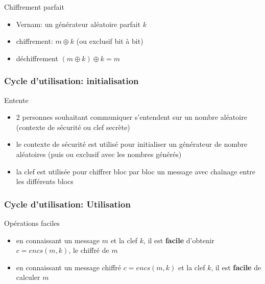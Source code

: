 \begin{reveals}
\begin{frame}
  \vfill

  \begin{block}{Chiffrement parfait}
    \begin{itemize}
    \item Vernam: un générateur aléatoire parfait \(k\)
    \item chiffrement: \(m \oplus k\) (ou exclusif bit à bit)
    \item déchiffrement \((m \oplus k)\oplus k = m\) 
    \end{itemize}
  \end{block}

  \vfill


\end{frame}


\begin{frame}
  \frametitle{Cycle d'utilisation: initialisation}

  \vfill

  \begin{block}{Entente}
    \begin{itemize}
    \item 2 personnes souhaitant communiquer s'entendent sur un nombre
      aléatoire (contexte de sécurité ou clef secrète)
    \item le contexte de sécurité est utilisé pour initialiser un
      générateur de nombre aléatoires (puis ou exclusif avec les nombres générés)
    \item la clef est utilisée pour chiffrer bloc par bloc un message
      avec chaînage entre les différents blocs
    \end{itemize}
  \end{block}

  \vfill


\end{frame}



\begin{frame}
  \frametitle{Cycle d'utilisation: Utilisation}

  \vfill

  \begin{block}{Opérations faciles}
    \begin{itemize}
    \item en connaissant un message \(m\) et la clef \(k\), il est
      \textbf{facile} d'obtenir \(c=encs(m,k)\), le chiffré de \(m\)
    \item en connaissant un message chiffré \(c=encs(m,k)\) et la clef
      \(k\), il est \textbf{facile} de calculer \(m\)
    \end{itemize}
  \end{block}


\end{frame}
\end{reveals}
